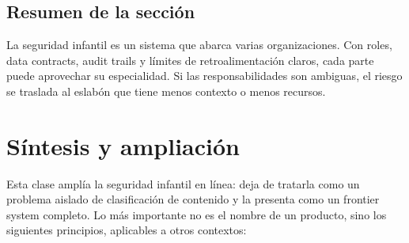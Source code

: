 \documentclass[a4paper]{article}
\begin{document}

\subsection{Resumen de la sección}

La seguridad infantil es un sistema que abarca varias organizaciones. Con roles, data contracts, audit trails y límites de retroalimentación claros, cada parte puede aprovechar su especialidad. Si las responsabilidades son ambiguas, el riesgo se traslada al eslabón que tiene menos contexto o menos recursos.
\section{Síntesis y ampliación}

Esta clase amplía la seguridad infantil en línea: deja de tratarla como un problema aislado de clasificación de contenido y la presenta como un frontier system completo. Lo más importante no es el nombre de un producto, sino los siguientes principios, aplicables a otros contextos:
\end{document}
